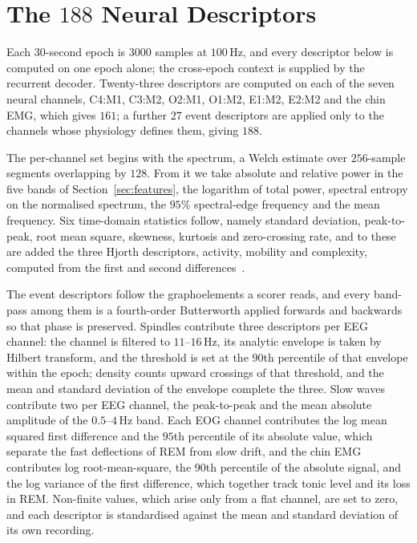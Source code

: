 \documentclass{ieeeaccess}
\begin{document}
\appendices
\section{The $188$ Neural Descriptors}
\label{app:features}
Each $30$-second epoch is $3000$ samples at $100$\,Hz, and every descriptor below is
computed on one epoch alone; the cross-epoch context is supplied by the recurrent decoder.
Twenty-three descriptors are computed on each of the seven neural channels, C4:M1, C3:M2,
O2:M1, O1:M2, E1:M2, E2:M2 and the chin EMG, which gives $161$; a further $27$ event
descriptors are applied only to the channels whose physiology defines them, giving $188$.

The per-channel set begins with the spectrum, a Welch estimate over $256$-sample
segments overlapping by $128$. From it we take absolute and relative power in the
five bands of Section~\ref{sec:features}, the logarithm of total power, spectral
entropy on the normalised spectrum, the $95\%$ spectral-edge frequency and the mean
frequency. Six time-domain statistics follow, namely standard deviation,
peak-to-peak, root mean square, skewness, kurtosis and zero-crossing rate, and to
these are added the three Hjorth descriptors, activity, mobility and complexity,
computed from the first and second differences~\cite{hjorth1970eeg}.

The event descriptors follow the graphoelements a scorer reads, and every band-pass
among them is a fourth-order Butterworth applied forwards and backwards so that
phase is preserved. Spindles contribute three descriptors per EEG channel: the
channel is filtered to $11$--$16$\,Hz, its analytic envelope is taken by Hilbert
transform, and the threshold is set at the $90$th percentile of that envelope within
the epoch; density counts upward crossings of that threshold, and the mean and
standard deviation of the envelope complete the three. Slow waves contribute two per
EEG channel, the peak-to-peak and the mean absolute amplitude of the $0.5$--$4$\,Hz
band. Each EOG channel contributes the log mean squared first difference and the
$95$th percentile of its absolute value, which separate the fast deflections of REM
from slow drift, and the chin EMG contributes log root-mean-square, the $90$th
percentile of the absolute signal, and the log variance of the first difference,
which together track tonic level and its loss in REM. Non-finite values, which arise
only from a flat channel, are set to zero, and each descriptor is standardised against
the mean and standard deviation of its own recording.
\end{document}
